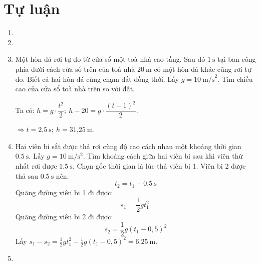 \section{Tự luận}
\begin{enumerate}[label=\bfseries Câu \arabic*:]
	\item {}
	
	
	
	\item {}
	
\item {}

\cauhoi
{Một hòn đá rơi tự do từ cửa sổ một toà nhà cao tầng. Sau đó $1\ \text{s}$ tại ban công phía dưới cách cửa sổ trên của toà nhà $20\ \text{m}$ có một hòn đá khác cũng rơi tự do. Biết cả hai hòn đá cùng chạm đất đồng thời. Lấy $g=10\ \text{m/s}^2$. Tìm chiều cao của cửa sổ toà nhà trên so với đất.	
}
\loigiai
{	Ta có: $h=g\cdot \dfrac{t^2}{2}; \ h-20=g\cdot \dfrac{\left(t-1 \right)^2 }{2}$.
	
	$\Rightarrow t=\text{2,5}\ \text{s}; \ h=\text{31,25}\ \text{m}$.  
}
\item {}

\cauhoi
{Hai viên bi sắt được thả rơi cùng độ cao cách nhau một khoảng thời gian $\SI{0,5}{\second}$. Lấy $g = \SI{10}{\meter/\second^2}$. Tìm khoảng cách giữa hai viên bi sau khi viên thứ nhất rơi được $\SI{1,5}{\second}$.
}
\loigiai
{	Chọn gốc thời gian là lúc thả viên bi 1. Viên bi 2 được thả sau $\SI{0,5}{\second}$ nên:
	$$t_2=t_1-\SI{0,5}{\second}$$
	Quãng đường viên bi 1 đi được:
	$$s_1=\frac{1}{2}gt_1^2.$$
	Quãng đường viên bi 2 đi được:
	$$s_2=\frac{1}{2}g(t_1-0,5)^2$$
	Lấy $s_1-s_2=\frac{1}{2}gt_1^2-\frac{1}{2}g(t_1-0,5)^2=\SI{6,25}{\meter}$.
}
\item {}


\end{enumerate}
